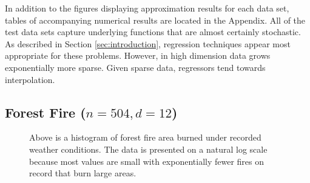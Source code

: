 \documentclass[smallextended,final]{svjour3}       %
\begin{document}
In addition to the figures displaying approximation results for each
data set, tables of accompanying numerical results are located in the
Appendix. All of the test data sets capture underlying functions that
are almost certainly stochastic. As described in Section
\ref{sec:introduction}, regression techniques appear most appropriate
for these problems. However, in high dimension data grows
exponentially more sparse. Given sparse data, regressors tend towards
interpolation.

\subsection{Forest Fire ($n = 504, d = 12$)}

\begin{figure}
  \centering
  \caption{Above is a histogram of forest fire area burned under
    recorded weather conditions. The data is presented on a natural
    log scale because most values are small with exponentially fewer
    fires on record that burn large areas.}
  \label{fig:hist-forest-fire}
\end{figure}
\end{document}
